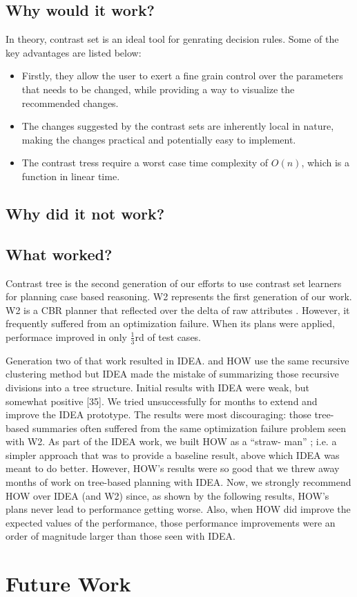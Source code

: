 \documentclass[conference]{IEEEtran}
\begin{document}
\subsection{Why would it work?}
In theory, contrast set is an ideal tool for genrating decision rules. Some of the key advantages are listed below:
\begin{itemize}
\item Firstly, they allow the user to exert a fine grain control over the parameters that needs to be changed, while providing a way to visualize the recommended changes.
\item The changes suggested by the contrast sets are inherently local in nature, making the changes practical and potentially easy to implement.
\item The contrast tress require a worst case time complexity of $O(n)$, which is a function in linear time.
\end{itemize}
\subsection{Why did it not work?}
\subsection{What worked?}
Contrast tree is the second generation of our efforts to use contrast set learners for planning case based reasoning. W2 represents the first generation of our work. W2 is a CBR planner that reflected over the delta of raw attributes \cite{}. However, it frequently suffered from an optimization failure. When its plans were applied, performace improved in only  $\tfrac{1}{3}$rd of test cases. 

Generation two of that work resulted in IDEA. 
and HOW use the same recursive clustering method but IDEA made the mistake of summarizing those recursive divisions into a tree structure. Initial results with IDEA were weak, but somewhat positive [35]. We tried unsuccessfully for months to extend and improve the IDEA prototype. The results were most discouraging: those tree-based summaries often suffered from the same optimization failure problem seen with W2. As part of the IDEA work, we built HOW as a “straw-
man” ; i.e. a simpler approach that was to provide a baseline result, above which IDEA was meant to do better. However, HOW’s results were so good that we threw away months of work on tree-based planning with IDEA. Now, we strongly recommend HOW over IDEA (and W2) since, as shown by the following results, HOW’s plans never lead to performance getting worse. Also, when HOW did improve the expected values of the performance, those performance improvements were an order of magnitude larger than those seen with IDEA. 
\section{Future Work}
\end{document}
